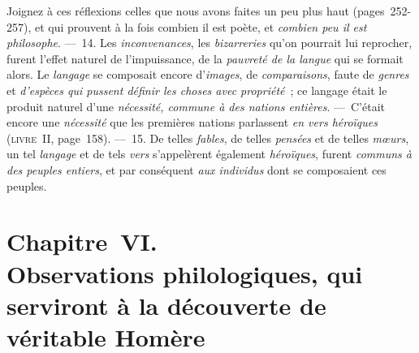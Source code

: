 \documentclass[french,twoside]{book} %
\newcommand\chapteropen{} %
\newcommand\chapterclose{} %
\begin{document}
Joignez à ces réflexions celles que nous avons faites un peu plus haut (pages 252-257), et qui prouvent à la fois combien il est poète, et {\itshape combien peu il est philosophe}. — 14. Les {\itshape inconvenances}, les {\itshape bizarreries} qu’on pourrait lui reprocher, furent l’effet naturel de l’impuissance, de la {\itshape pauvreté de la langue} qui se formait alors. Le {\itshape langage} se composait encore d’{\itshape images}, de {\itshape comparaisons}, faute de {\itshape genres} et {\itshape d’espèces qui pussent définir les choses avec propriété} ; ce langage était le produit naturel d’une {\itshape nécessité, commune à des nations entières}. — C’était encore une {\itshape nécessité} que les premières nations parlassent {\itshape en vers héroïques} ({\scshape livre} II, page 158). — 15. De telles {\itshape fables}, de telles {\itshape pensées} et de telles {\itshape mœurs}, un tel {\itshape langage} et de tels {\itshape vers} s’appelèrent également {\itshape héroïques}, furent {\itshape communs à des peuples entiers}, et par conséquent {\itshape aux individus} dont se composaient ces peuples.
\chapterclose


\chapteropen
\chapter[{Chapitre VI. Observations philologiques, qui serviront à la découverte de véritable Homère}]{Chapitre VI. \\
Observations philologiques, qui serviront à la découverte de véritable Homère}
\end{document}
